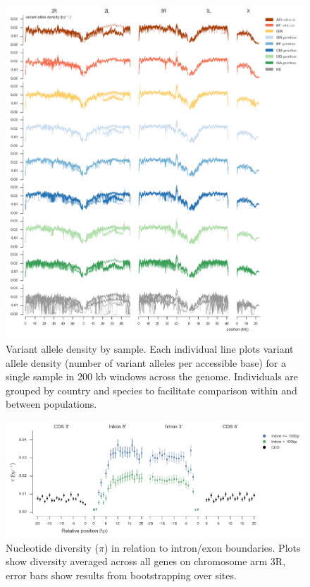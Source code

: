 \begin{refsection}
\clearpage
\begin{figure}[h]
\centering
\includegraphics[width=1.1\textwidth,center]{artwork/chapter3/sample_variant_density.pdf}
\caption{Variant allele density by sample.
%
Each individual line plots variant allele density (number of variant alleles per accessible base) for a single sample in 200 kb windows across the genome.
%
Individuals are grouped by country and species to facilitate comparison within and between populations.
}
%
\label{fig:ch3-sample_variant_density}
\end{figure}


\clearpage
\begin{figure}[h]
\centering
\includegraphics[width=1.1\textwidth,center]{artwork/chapter3/splicing_pi.png}
\caption{Nucleotide diversity ($\pi$) in relation to intron/exon boundaries.
%
Plots show diversity averaged across all genes on chromosome arm 3R, error bars show results from bootstrapping over sites.
}
%
\label{fig:ch3-splicing_pi}
\end{figure}



\end{refsection}
